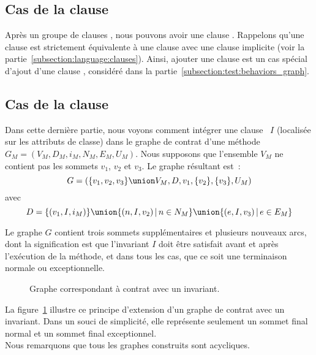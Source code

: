 \subsection{Cas de la clause \adefault}
\label{subsection:test:default_graph}

Après un groupe de clauses \abehavior, nous pouvons avoir une clause \adefault.
Rappelons qu'une clause \adefault est strictement équivalente à une clause
\abehavior avec une clause \arequires implicite (voir la
partie~\ref{subsection:language:clauses}). Ainsi, ajouter une clause \adefault
est un cas spécial d'ajout d'une clause \abehavior, considéré dans la
partie~\ref{subsection:test:behaviors_graph}.

\subsection{Cas de la clause \ainvariant}
\label{subsection:test:invariant_graph}

Dans cette dernière partie, nous voyons comment intégrer une clause
\ainvariant~$I$ (localisée sur les attributs de classe) dans le graphe de
contrat d'une méthode $G_M = (V_M, D_M, i_M, N_M, E_M, U_M)$. Nous supposons que
l'ensemble $V_M$ ne contient pas les sommets $v_1$, $v_2$ et $v_3$. Le graphe
résultant est~:
%
$$G = (
  \{v_1, v_2, v_3\} \union V_M,
  D,
  v_1,
  \{v_2\},
  \{v_3\},
  U_M
)$$
%
avec
%
$$D = \{(v_1, I, i_M)\} \union
      \{(n, I, v_2) \,\vert\, n \in N_M\} \union
      \{(e, I, v_3) \,\vert\, e \in E_M\}$$

Le graphe $G$ contient trois sommets supplémentaires et plusieurs nouveaux arcs,
dont la signification est que l'invariant $I$ doit être satisfait avant et après
l'exécution de la méthode, et dans tous les cas, que ce soit une terminaison
normale ou exceptionnelle.

\begin{figure}


\caption{\label{figure:test:invariant_graph} Graphe correspondant à contrat avec
un invariant.}

\end{figure}

La figure~\ref{figure:test:invariant_graph} illustre ce principe d'extension
d'un graphe de contrat avec un invariant. Dans un souci de simplicité, elle
représente seulement un sommet final normal et un sommet final exceptionnel. \\

Nous remarquons que tous les graphes construits sont acycliques.
